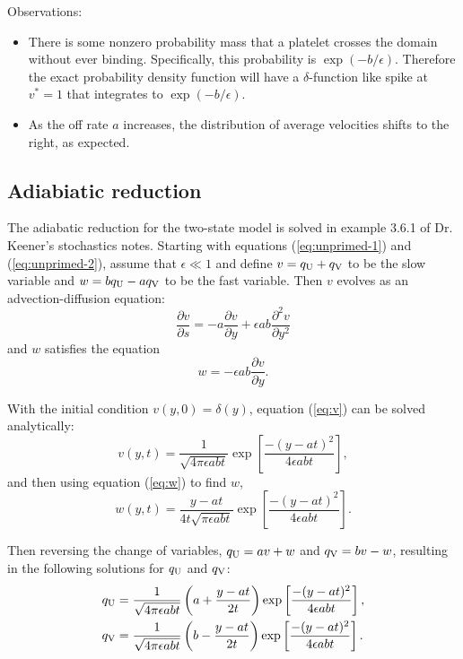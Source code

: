 \documentclass{article}
\newcommand{\tn}{\textnormal}
\newcommand{\Pder}[2]{\frac{\partial #1}{\partial #2}}
\begin{document}
Observations:
\begin{itemize}
\item There is some nonzero probability mass that a platelet crosses
  the domain without ever binding. Specifically, this probability is
  $\exp(-b/\epsilon)$. Therefore the exact probability density
  function will have a $\delta$-function like spike at $v^* = 1$ that
  integrates to $\exp(-b/\epsilon)$.
\item As the off rate $a$ increases, the distribution of average
  velocities shifts to the right, as expected.
\end{itemize}

\subsection{Adiabiatic reduction}
\label{sec:adiabiatic-reduction}

The adiabatic reduction for the two-state model is solved in example
3.6.1 of Dr. Keener's stochastics notes. Starting with equations
(\ref{eq:unprimed-1}) and (\ref{eq:unprimed-2}), assume that
$\epsilon \ll 1$ and define $v = q_\tn{U} + q_\tn{V}$ to be the slow
variable and $w = b q_\tn{U} - a q_\tn{V}$ to be the fast
variable. Then $v$ evolves as an advection-diffusion equation:
\begin{equation}
  \label{eq:v}
  \Pder{v}{s} = -a \Pder{v}{y} + \epsilon a b \frac{\partial^2
    v}{\partial y^2}
\end{equation}
and $w$ satisfies the equation
\begin{equation}
  \label{eq:w}
  w = -\epsilon a b \Pder{v}{y}.
\end{equation}

With the initial condition $v(y, 0) = \delta(y)$, equation
(\ref{eq:v}) can be solved analytically:
\begin{equation}
  \label{eq:v-soln}
  v(y, t) = \frac{1}{\sqrt{4 \pi \epsilon a b t}} \exp \left[ \frac{-(y
      - at)^2}{4 \epsilon a b t} \right],
\end{equation}
and then using equation (\ref{eq:w}) to find $w$,
\begin{equation}
  \label{eq:w-soln}
  w(y, t) = \frac{y - at}{4t\sqrt{\pi \epsilon a b t}} \exp \left[ \frac{-(y
      - at)^2}{4 \epsilon a b t} \right].
\end{equation}

Then reversing the change of variables, $q_\tn{U} = av + w$ and
$q_\tn{V} = bv - w$, resulting in the following solutions for
$q_\tn{U}$ and $q_\tn{V}$:
\begin{align}
  \label{eq:qu-soln}
  q_\tn{U} &= \frac{1}{\sqrt{4 \pi \epsilon a b t}} \left(a + \frac{y
             - at}{2t} \right) \exp \left[ \frac{-(y - at)^2}{4
             \epsilon a b t} \right], \\
  \label{eq:qv-soln}
  q_\tn{V} &= \frac{1}{\sqrt{4 \pi \epsilon a b t}} \left(b - \frac{y
             - at}{2t} \right) \exp \left[ \frac{-(y - at)^2}{4
             \epsilon a b t} \right].
\end{align}
\end{document}
